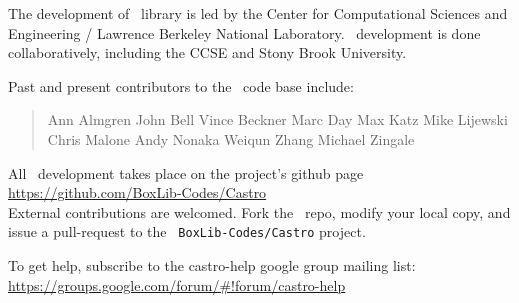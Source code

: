 The development of \amrex\ library is led by the
Center for Computational Sciences and Engineering / Lawrence Berkeley
National Laboratory.  \castro\ development is done collaboratively,
including the CCSE and Stony Brook University.

Past and present contributors to the \castro\ code base include:

\begin{quote}
Ann Almgren\newline
John Bell\newline
Vince Beckner\newline
Marc Day\newline
Max Katz\newline
Mike Lijewski\newline
Chris Malone\newline
Andy Nonaka\newline
Weiqun Zhang\newline
Michael Zingale
\end{quote}

All \castro\ development takes place on the project's github page\\[0.5em]
\url{https://github.com/BoxLib-Codes/Castro}\\[0.5em]
External contributions are welcomed.  Fork the \castro\ repo, modify
your local copy, and issue a pull-request to the {\tt
BoxLib-Codes/Castro} project.

To get help, subscribe to the castro-help google group mailing list:
\url{https://groups.google.com/forum/#!forum/castro-help}
